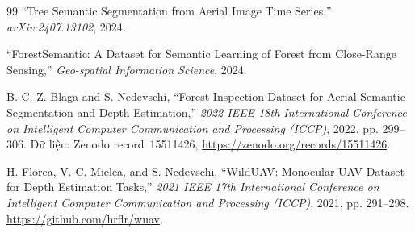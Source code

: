 \begin{thebibliography}{99}
``Tree Semantic Segmentation from Aerial Image Time Series,''
\textit{arXiv:2407.13102}, 2024.

``ForestSemantic: A Dataset for Semantic Learning of Forest from Close-Range Sensing,''
\textit{Geo-spatial Information Science}, 2024.

B.-C.-Z. Blaga and S. Nedevschi,
``Forest Inspection Dataset for Aerial Semantic Segmentation and Depth Estimation,''
\textit{2022 IEEE 18th International Conference on Intelligent Computer Communication and Processing (ICCP)}, 2022, pp. 299--306.
Dữ liệu: Zenodo record~15511426, \url{https://zenodo.org/records/15511426}.

H. Florea, V.-C. Miclea, and S. Nedevschi,
``WildUAV: Monocular UAV Dataset for Depth Estimation Tasks,''
\textit{2021 IEEE 17th International Conference on Intelligent Computer Communication and Processing (ICCP)}, 2021, pp. 291--298.
\url{https://github.com/hrflr/wuav}.

\end{thebibliography}
